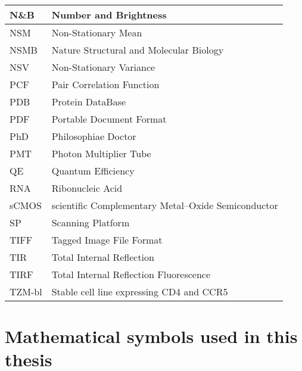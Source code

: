 \documentclass[12pt,]{book}
\theoremstyle{definition}
\theoremstyle{definition}
\theoremstyle{definition}
\theoremstyle{remark}
\begin{document}
\begin{longtable}{l|l}
\hline
N\&B & Number and Brightness\\
\hline
NSM & Non-Stationary Mean\\
\hline
NSMB & Nature Structural and Molecular Biology\\
\hline
NSV & Non-Stationary Variance\\
\hline
PCF & Pair Correlation Function\\
\hline
PDB & Protein DataBase\\
\hline
PDF & Portable Document Format\\
\hline
PhD & Philosophiae Doctor\\
\hline
PMT & Photon Multiplier Tube\\
\hline
QE & Quantum Efficiency\\
\hline
RNA & Ribonucleic Acid\\
\hline
sCMOS & scientific Complementary Metal–Oxide Semiconductor\\
\hline
SP & Scanning Platform\\
\hline
TIFF & Tagged Image File Format\\
\hline
TIR & Total Internal Reflection\\
\hline
TIRF & Total Internal Reflection Fluorescence\\
\hline
TZM-bl & Stable cell line expressing CD4 and CCR5\\
\hline
\end{longtable}

\section*{Mathematical symbols used in this
thesis}\label{mathematical-symbols-used-in-this-thesis}
\end{document}
